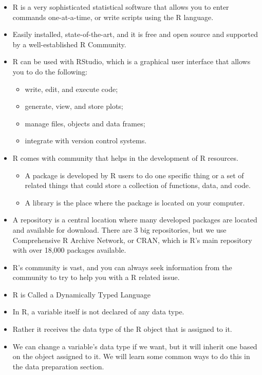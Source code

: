 \documentclass[
  letterpaper,
  DIV=11,
  numbers=noendperiod]{scrreprt}
\providecommand{\tightlist}{%
  \setlength{\itemsep}{0pt}\setlength{\parskip}{0pt}}\usepackage{longtable,booktabs,array}
\begin{document}
\begin{itemize}
\item
  R is a very sophisticated statistical software that allows you to
  enter commands one-at-a-time, or write scripts using the R language.
\item
  Easily installed, state-of-the-art, and it is free and open source and
  supported by a well-established R Community.
\item
  R can be used with RStudio, which is a graphical user interface that
  allows you to do the following:

  \begin{itemize}
  \tightlist
  \item
    write, edit, and execute code;
  \item
    generate, view, and store plots;
  \item
    manage files, objects and data frames;
  \item
    integrate with version control systems.
  \end{itemize}
\item
  R comes with community that helps in the development of R resources.

  \begin{itemize}
  \tightlist
  \item
    A package is developed by R users to do one specific thing or a set
    of related things that could store a collection of functions, data,
    and code.
  \item
    A library is the place where the package is located on your
    computer.
  \end{itemize}
\item
  A repository is a central location where many developed packages are
  located and available for download. There are 3 big repositories, but
  we use Comprehensive R Archive Network, or CRAN, which is R's main
  repository with over 18,000 packages available.
\item
  R's community is vast, and you can always seek information from the
  community to try to help you with a R related issue.
\item
  R is Called a Dynamically Typed Language
\item
  In R, a variable itself is not declared of any data type.
\item
  Rather it receives the data type of the R object that is assigned to
  it.
\item
  We can change a variable's data type if we want, but it will inherit
  one based on the object assigned to it. We will learn some common ways
  to do this in the data preparation section.
\end{itemize}
\end{document}
